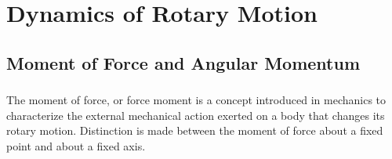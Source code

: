 

\chapter{Dynamics of Rotary Motion}
\label{ch-04}

\section{Moment of Force and Angular Momentum}
\label{sec-4.1}
\subsection{}\label{4.1.1} The moment of force, or force moment is a concept introduced in mechanics to characterize the external mechanical action exerted on a body that changes its rotary motion. Dis­tinction is made between the moment of force about a fixed point and about a fixed axis.

